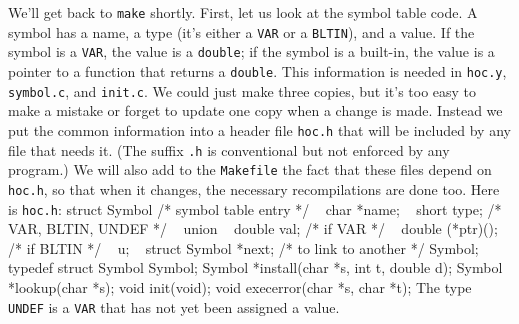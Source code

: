 {We'll get back to {\tt make} shortly. First, let us look at
the symbol table code. A symbol has a name, a type (it's
either a {\tt VAR} or a {\tt BLTIN}), and a value. If the
symbol is a {\tt VAR}, the value is a {\tt double}; if the
symbol is a built-in, the value is a pointer to a function
that returns a {\tt double}. This information is needed in
{\tt hoc.y}, {\tt symbol.c}, and {\tt init.c}. We could just
make three copies, but it's too easy to make a mistake or
forget to update one copy when a change is made. Instead
we put the common information into a header file {\tt hoc.h}
that will be included by any file that needs it. (The suffix
{\tt.h} is conventional but not enforced by any program.)
We will also add to the {\tt Makefile} the fact that these
files depend on {\tt hoc.h}, so that when it changes, the
necessary recompilations are done too. Here is {\tt hoc.h}:
\begincode
struct Symbol {            /* symbol table entry */
~       char    *name;
~       short   type;            /* VAR, BLTIN, UNDEF */
~       union {
~               double  val;            /* if VAR */
~               double  (*ptr)();       /* if BLTIN */
~       } u;
~       struct Symbol   *next;   /* to link to another */
} Symbol;
\smallskip
typedef struct Symbol Symbol;
\smallskip
Symbol *install(char *s, int t, double d);
Symbol *lookup(char *s);
\smallskip
void init(void);
void execerror(char *s, char *t);
\endcode
\noindent
The type {\tt UNDEF} is a {\tt VAR} that has not yet been
assigned a value.

}
